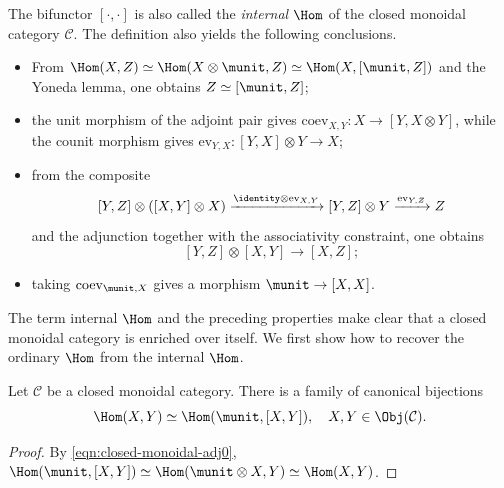 The bifunctor $[\cdot,\cdot]$ is also called the \emph{internal $\Hom$} of the
closed monoidal category $\mathcal{C}$. The definition also yields the
following conclusions.
\begin{itemize}
	\item From
	$\Hom(X,Z)\simeq\Hom(X\otimes\munit,Z)\simeq\Hom(X,[\munit,Z])$ and the
	Yoneda lemma, one obtains $Z\simeq[\munit,Z]$;
	\item the unit morphism of the adjoint pair gives
	$\mathrm{coev}_{X,Y}:X\to[Y,X\otimes Y]$, while the counit morphism gives
	$\mathrm{ev}_{Y,X}:[Y,X]\otimes Y\to X$;
	\item from the composite
	\[ [Y, Z] \otimes ([X, Y] \otimes X) \xrightarrow{\identity \otimes \mathrm{ev}_{X, Y}} [Y, Z] \otimes Y \xrightarrow{\mathrm{ev}_{Y, Z}} Z \]
	and the adjunction together with the associativity constraint, one obtains
	\[ [Y, Z] \otimes [X, Y] \to [X, Z]; \]
	\item taking $\mathrm{coev}_{\munit,X}$ gives a morphism
	$\munit\to[X,X]$.
\end{itemize}

The term internal $\Hom$ and the preceding properties make clear that a closed
monoidal category is enriched over itself. We first show how to recover the
ordinary $\Hom$ from the internal $\Hom$.

\begin{proposition}
	Let $\mathcal{C}$ be a closed monoidal category. There is a family of
	canonical bijections
	\[ \Hom(X, Y) \simeq \Hom(\munit, [X, Y]), \quad X, Y \in \Obj(\mathcal{C}). \]
\end{proposition}

\begin{proof}
	By \eqref{eqn:closed-monoidal-adj0},
	$\Hom(\munit,[X,Y])\simeq\Hom(\munit\otimes X,Y)\simeq\Hom(X,Y)$.
\end{proof}

